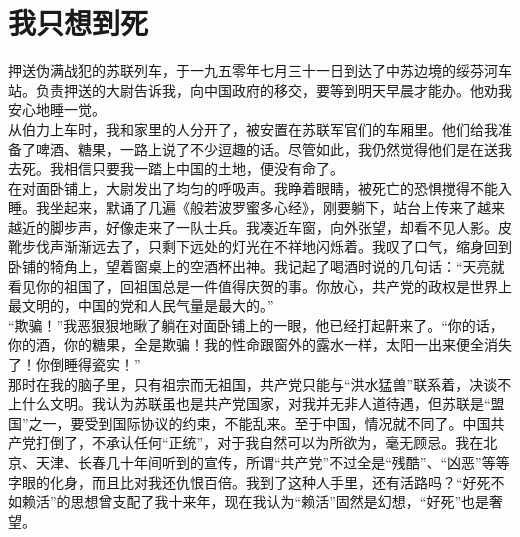 \fancyhead[RO]{\thepage} %
\fancyhead[LE]{\thepage} %
\chapter*{我只想到死}
押送伪满战犯的苏联列车，于一九五零年七月三十一日到达了中苏边境的绥芬河车站。负责押送的大尉告诉我，向中国政府的移交，要等到明天早晨才能办。他劝我安心地睡一觉。\\

从伯力上车时，我和家里的人分开了，被安置在苏联军官们的车厢里。他们给我准备了啤酒、糖果，一路上说了不少逗趣的话。尽管如此，我仍然觉得他们是在送我去死。我相信只要我一踏上中国的土地，便没有命了。\\

在对面卧铺上，大尉发出了均匀的呼吸声。我睁着眼睛，被死亡的恐惧搅得不能入睡。我坐起来，默诵了几遍《般若波罗蜜多心经》，刚要躺下，站台上传来了越来越近的脚步声，好像走来了一队士兵。我凑近车窗，向外张望，却看不见人影。皮靴步伐声渐渐远去了，只剩下远处的灯光在不祥地闪烁着。我叹了口气，缩身回到卧铺的犄角上，望着窗桌上的空酒杯出神。我记起了喝酒时说的几句话：“天亮就看见你的祖国了，回祖国总是一件值得庆贺的事。你放心，共产党的政权是世界上最文明的，中国的党和人民气量是最大的。”\\

“欺骗！”我恶狠狠地瞅了躺在对面卧铺上的一眼，他已经打起鼾来了。“你的话，你的酒，你的糖果，全是欺骗！我的性命跟窗外的露水一样，太阳一出来便全消失了！你倒睡得瓷实！”\\

那时在我的脑子里，只有祖宗而无祖国，共产党只能与“洪水猛兽”联系着，决谈不上什么文明。我认为苏联虽也是共产党国家，对我并无非人道待遇，但苏联是“盟国”之一，要受到国际协议的约束，不能乱来。至于中国，情况就不同了。中国共产党打倒了，不承认任何“正统”，对于我自然可以为所欲为，毫无顾忌。我在北京、天津、长春几十年间听到的宣传，所谓“共产党”不过全是“残酷”、“凶恶”等等字眼的化身，而且比对我还仇恨百倍。我到了这种人手里，还有活路吗？“好死不如赖活”的思想曾支配了我十来年，现在我认为“赖活”固然是幻想，“好死”也是奢望。\\

